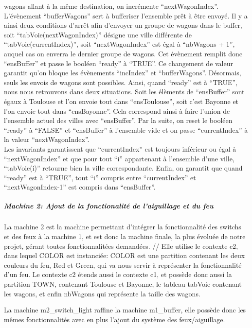 wagons allant à la même destination, on incrémente ``nextWagonIndex''.
L'évènement ``bufferWagons'' sert à bufferiser l'ensemble prêt à être envoyé. Il y a
ainsi deux conditions d'arrêt afin d'envoyer un groupe de wagons dans le buffer,
soit ``tabVoie(nextWagonIndex)'' désigne une ville différente de
``tabVoie(currentIndex)'', soit ``nextWagonIndex'' est égal à ``nbWagons + 1'', auquel
cas on enverra le dernier groupe de wagons. Cet évènement remplit donc ``ensBuffer''
et passe le booléen ``ready'' à ``TRUE''. Ce changement de valeur garantit qu'on
bloque les évènements ``incIndex'' et ``bufferWagons''. Désormais, seuls les envois
de wagons sont possibles.
Ainsi, quand ``ready'' est à ``TRUE'', nous nous retrouvons dans deux situations.
Soit les élèments de ``ensBuffer'' sont égaux à Toulouse et l'on envoie tout dans
``ensToulouse'', soit c'est Bayonne et l'on envoie tout dans ``ensBayonne''. Cela
correspond ainsi à faire l'union de l'ensemble actuel des villes avec ``ensBuffer''.
Par la suite, on reset le booléen ``ready'' à ``FALSE'' et ``ensBuffer'' à l'ensemble
vide et on passe ``currentIndex'' à la valeur ``nextWagonIndex''.
\\
Les invariants garantissent que ``currentIndex'' est toujours inférieur ou égal à
``nextWagonIndex'' et que pour tout ``i'' appartenant à l'ensemble d'une ville,
``tabVoie(i)'' retourne bien la ville correspondante. Enfin, on garantit que quand
``ready'' est à ``TRUE'', tout ``i'' compris entre ``currentIndex'' et ``nextWagonIndex-1'' est compris dans ``ensBuffer''.


\subparagraph{Machine 2: Ajout de la fonctionalité de l'aiguillage et du feu}



La machine 2 est la machine permettant d'intégrer la fonctionnalité des switchs et des feux à la machine 1, et est donc la machine finale, la plus évoluée de notre projet, gérant toutes fonctionnalitées demandées.
//
Elle utilise le contexte c2,  dans lequel COLOR est instanciée: COLOR est une  partition contenant les deux couleurs du feu, Red et Green, qui va nous servir à représenter la fonctionnalité d'un feu.
Le contexte c2 étends aussi le contexte c1, et possède donc aussi la partition TOWN, contenant Toulouse et Bayonne, le tableau tabVoie contenant les wagons, et enfin nbWagons qui représente la taille des wagons.

La machine m2\_switch\_light raffine la machine m1\_buffer, elle possède donc les mêmes fonctionnalités avec en plus l'ajout du système des feux/aiguillage.


